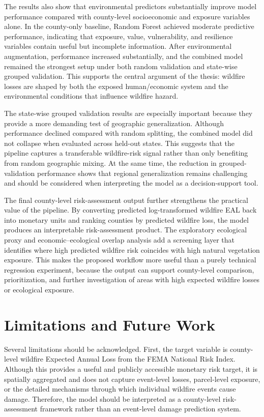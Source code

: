 The results also show that environmental predictors substantially improve model performance compared with county-level socioeconomic and exposure variables alone. In the county-only baseline, Random Forest achieved moderate predictive performance, indicating that exposure, value, vulnerability, and resilience variables contain useful but incomplete information. After environmental augmentation, performance increased substantially, and the combined model remained the strongest setup under both random validation and state-wise grouped validation. This supports the central argument of the thesis: wildfire losses are shaped by both the exposed human/economic system and the environmental conditions that influence wildfire hazard.

The state-wise grouped validation results are especially important because they provide a more demanding test of geographic generalization. Although performance declined compared with random splitting, the combined model did not collapse when evaluated across held-out states. This suggests that the pipeline captures a transferable wildfire-risk signal rather than only benefiting from random geographic mixing. At the same time, the reduction in grouped-validation performance shows that regional generalization remains challenging and should be considered when interpreting the model as a decision-support tool.

The final county-level risk-assessment output further strengthens the practical value of the pipeline. By converting predicted log-transformed wildfire EAL back into monetary units and ranking counties by predicted wildfire loss, the model produces an interpretable risk-assessment product. The exploratory ecological proxy and economic--ecological overlap analysis add a screening layer that identifies where high predicted wildfire risk coincides with high natural vegetation exposure. This makes the proposed workflow more useful than a purely technical regression experiment, because the output can support county-level comparison, prioritization, and further investigation of areas with high expected wildfire losses or ecological exposure.

\section{Limitations and Future Work}

Several limitations should be acknowledged. First, the target variable is county-level wildfire Expected Annual Loss from the FEMA National Risk Index. Although this provides a useful and publicly accessible monetary risk target, it is spatially aggregated and does not capture event-level losses, parcel-level exposure, or the detailed mechanisms through which individual wildfire events cause damage. Therefore, the model should be interpreted as a county-level risk-assessment framework rather than an event-level damage prediction system.

